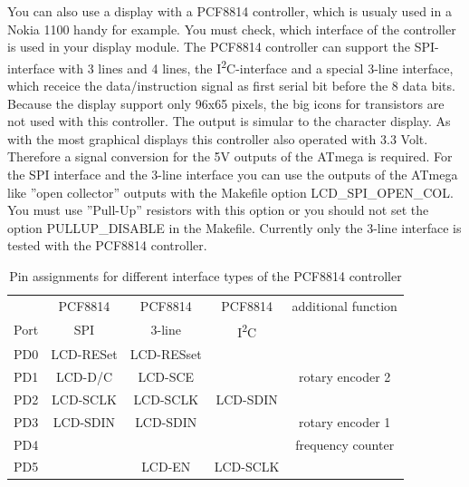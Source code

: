 You can also use a display with a PCF8814 controller, which is usualy used in a Nokia 1100 handy for example.
You must check, which interface of the controller is used in your display module.
The PCF8814 controller can support the SPI-interface with 3 lines and 4 lines,
the I\textsuperscript{2}C-interface and a special 3-line interface, which receice
the data/instruction signal as first serial bit before the 8 data bits.
Because the display support only 96x65 pixels, the big icons for transistors are not
used with this controller. The output is simular to the character display.
As with the most graphical displays this controller also operated with 3.3 Volt.
Therefore a signal conversion for the 5V outputs of the ATmega is required.
For the SPI interface and the 3-line interface you can use the outputs of the ATmega
like ''open collector'' outputs with the Makefile option LCD\_SPI\_OPEN\_COL.
You must use ''Pull-Up'' resistors with this option or you should not set
the option PULLUP\_DISABLE in the Makefile.
Currently only the 3-line interface is tested with the PCF8814 controller.

\begin{table}[H]
  \begin{center}
    \begin{tabular}{| c || c | c | c | c |}
    \hline
           &  PCF8814    & PCF8814        & PCF8814     & additional function \\
      Port &    SPI      & 3-line         &   I\textsuperscript{2}C      & \\
    \hline
    \hline
    PD0    &   LCD-RESet  & LCD-RESset       &            & \\
    \hline
    PD1    &   LCD-D/C   & LCD-SCE        &             & rotary encoder 2 \\
    \hline
    PD2    &   LCD-SCLK  & LCD-SCLK       &  LCD-SDIN   & \\
    \hline
    PD3    &   LCD-SDIN  & LCD-SDIN       &             & rotary encoder 1 \\
    \hline
    PD4    &             &                &             & frequency counter \\
    \hline
    PD5    &             & LCD-EN         &   LCD-SCLK  & \\
    \hline
    \end{tabular}
  \end{center}
  \caption{Pin assignments for different interface types of the PCF8814 controller}
  \label{tab:PCF8814-con}
\end{table}

